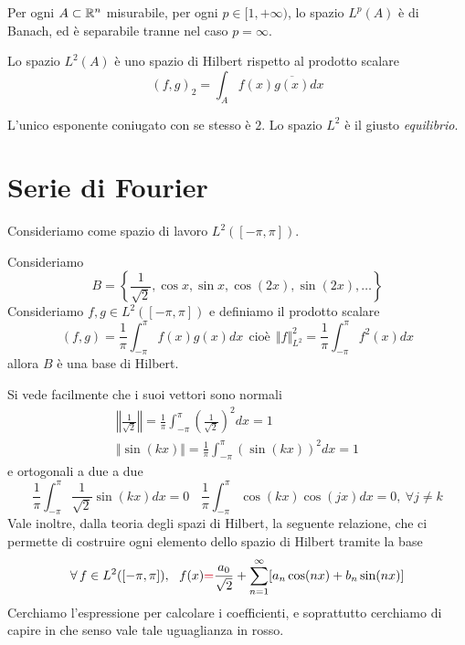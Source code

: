 \begin{thm}
Per ogni $A\subset \mathbb{R}^{n}$ misurabile, per ogni $p\in [1, + \infty)$, lo spazio $L^{p}(A)$ è di Banach, ed è separabile tranne nel caso $p = \infty $.
\end{thm}
\begin{thm}
Lo spazio $L^{2}(A)$ è uno spazio di Hilbert rispetto al prodotto scalare
\begin{equation*}
(f, g)_{2} = \int_{A} f(x)\overline{g(x)} dx
\end{equation*}
\end{thm}
\begin{rem}
L'unico esponente coniugato con se stesso è $2$. Lo spazio $L^{2}$ è il giusto \textit{equilibrio}.
\end{rem}

\section{Serie di Fourier}

Consideriamo come spazio di lavoro $L^{2}([ - \pi, \pi])$.
\begin{thm}
Consideriamo
\begin{equation*}
B = \left\{\frac{1}{\sqrt{2}}, \cos x, \sin x, \cos(2x), \sin(2x), \dotsc \right\}
\end{equation*}
Consideriamo $f, g\in L^{2}([ - \pi, \pi])$ e definiamo il prodotto scalare
\begin{equation*}
\boxed{(f, g) = \frac{1}{\pi}\int^{\pi}_{- \pi} f(x) g(x) dx} \ \ \text{cioè} \ \ \Vert f \Vert^{2}_{L^{2}} = \frac{1}{\pi}\int^{\pi}_{- \pi} f^{2}(x) dx
\end{equation*}
allora $B$ è una base di Hilbert.
\end{thm}
Si vede facilmente che i suoi vettori sono normali
\begin{gather*}
\left \Vert \frac{1}{\sqrt{2}}\right \Vert = \frac{1}{\pi}\int^{\pi}_{- \pi}\left(\frac{1}{\sqrt{2}}\right)^{2} dx = 1\\
\Vert \sin(kx) \Vert = \frac{1}{\pi}\int^{\pi}_{- \pi}(\sin(kx))^{2} dx = 1
\end{gather*}
e ortogonali a due a due
\begin{equation*}
\frac{1}{\pi}\int^{\pi}_{- \pi}\frac{1}{\sqrt{2}}\sin(kx) dx = 0\ \ \ \ \frac{1}{\pi}\int^{\pi}_{- \pi}\cos(kx)\cos(jx) dx = 0, \ \forall j\neq k
\end{equation*}
Vale inoltre, dalla teoria degli spazi di Hilbert, la seguente relazione, che ci permette di costruire ogni elemento dello spazio di Hilbert tramite la base
\begin{equation*}
\forall f\in L^{2}([ - \pi, \pi]), \ \ f(x)\textcolor[rgb]{0.82, 0.01, 0.11}{=}\frac{a_{0}}{\sqrt{2}} + \sum\limits^{\infty}_{n = 1}[a_{n}\cos(nx) + b_{n}\sin(nx)]
\end{equation*}
Cerchiamo l'espressione per calcolare i coefficienti, e soprattutto cerchiamo di capire in che senso vale tale uguaglianza in rosso.

